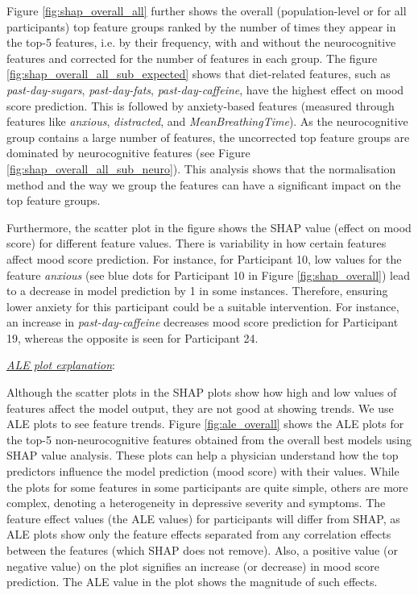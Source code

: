 Figure \ref{fig:shap_overall_all} further shows the overall (population-level or for all participants) top feature groups ranked by the number of times they appear in the top-5 features, i.e. by their frequency, with and without the neurocognitive features and corrected for the number of features in each group. The figure \ref{fig:shap_overall_all_sub_expected} shows that diet-related features, such as \emph{past-day-sugars}, \emph{past-day-fats}, \emph{past-day-caffeine}, have the highest effect on mood score prediction. This is followed by anxiety-based features (measured through features like \emph{anxious}, \emph{distracted}, and \emph{MeanBreathingTime}). As the neurocognitive group contains a large number of features, the uncorrected top feature groups are dominated by neurocognitive features (see Figure \ref{fig:shap_overall_all_sub_neuro}). This analysis shows that the normalisation method and the way we group the features can have a significant impact on the top feature groups.

Furthermore, the scatter plot in the figure shows the SHAP value (effect on mood score) for different feature values. There is variability in how certain features affect mood score prediction. For instance, for Participant 10, low values for the feature \emph{anxious} (see blue dots for Participant 10 in Figure \ref{fig:shap_overall}) lead to a decrease in model prediction by 1 in some instances. Therefore, ensuring lower anxiety for this participant could be a suitable intervention. For instance, an increase in \emph{past-day-caffeine} decreases mood score prediction for Participant 19, whereas the opposite is seen for Participant 24.



\underline{\textit{ALE plot explanation}}:

Although the scatter plots in the SHAP plots show how high and low values of features affect the model output, they are not good at showing trends. We use ALE plots to see feature trends. Figure \ref{fig:ale_overall} shows the ALE plots for the top-5 non-neurocognitive features obtained from the overall best models using SHAP value analysis. These plots can help a physician understand how the top predictors influence the model prediction (mood score) with their values. While the plots for some features in some participants are quite simple, others are more complex, denoting a heterogeneity in depressive severity and symptoms. The feature effect values (the ALE values) for participants will differ from SHAP, as ALE plots show only the feature effects separated from any correlation effects between the features (which SHAP does not remove). Also, a positive value (or negative value) on the plot signifies an increase (or decrease) in mood score prediction. The ALE value in the plot shows the magnitude of such effects.

